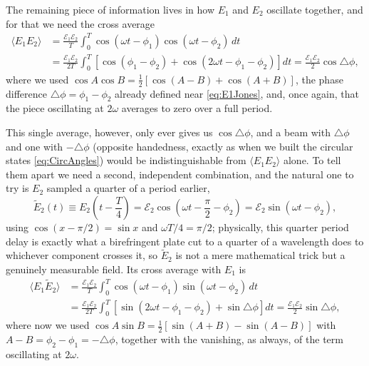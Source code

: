         The remaining piece of information lives in how $E_1$ and $E_2$ oscillate together, and for that we need the cross average
        \begin{align*}
            \langle E_1E_2\rangle &= \frac{\mathcal E_1\mathcal E_2}{T}\int_0^T\cos(\omega t-\phi_1)\cos(\omega t-\phi_2)\,dt \\
            &= \frac{\mathcal E_1\mathcal E_2}{2T}\int_0^T\left[\cos(\phi_1-\phi_2)+\cos(2\omega t-\phi_1-\phi_2)\right]dt = \frac{\mathcal E_1\mathcal E_2}{2}\cos\triangle\phi,
        \end{align*}
        where we used $\cos A\cos B=\frac12[\cos(A-B)+\cos(A+B)]$, the phase difference $\triangle\phi=\phi_1-\phi_2$ already defined near \ref{eq:E1Jones}, and, once again, that the piece oscillating at $2\omega$ averages to zero over a full period.

        This single average, however, only ever gives us $\cos\triangle\phi$, and a beam with $\triangle\phi$ and one with $-\triangle\phi$ (opposite handedness, exactly as when we built the circular states \ref{eq:CircAngles}) would be indistinguishable from $\langle E_1E_2\rangle$ alone. To tell them apart we need a second, independent combination, and the natural one to try is $E_2$ sampled a quarter of a period earlier,
        \begin{equation*}
            \tilde{E}_2(t) \equiv E_2\!\left(t-\frac{T}{4}\right) = \mathcal E_2\cos\!\left(\omega t - \frac{\pi}{2}-\phi_2\right) = \mathcal E_2\sin(\omega t-\phi_2),
        \end{equation*}
        using $\cos(x-\pi/2)=\sin x$ and $\omega T/4=\pi/2$; physically, this quarter period delay is exactly what a birefringent plate cut to a quarter of a wavelength does to whichever component crosses it, so $\tilde E_2$ is not a mere mathematical trick but a genuinely measurable field. Its cross average with $E_1$ is
        \begin{align*}
            \langle E_1\tilde E_2\rangle &= \frac{\mathcal E_1\mathcal E_2}{T}\int_0^T \cos(\omega t-\phi_1)\sin(\omega t-\phi_2)\,dt \\
            &= \frac{\mathcal E_1\mathcal E_2}{2T}\int_0^T\left[\sin(2\omega t-\phi_1-\phi_2) + \sin\triangle\phi\right]dt = \frac{\mathcal E_1\mathcal E_2}{2}\sin\triangle\phi,
        \end{align*}
        where now we used $\cos A\sin B=\frac12[\sin(A+B)-\sin(A-B)]$ with $A-B=\phi_2-\phi_1=-\triangle\phi$, together with the vanishing, as always, of the term oscillating at $2\omega$.

